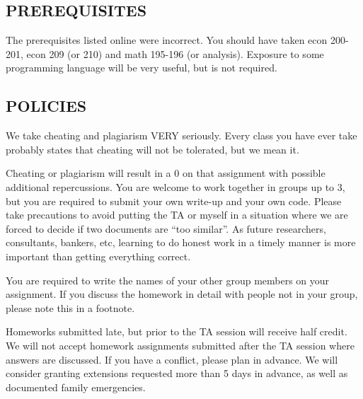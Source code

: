 \documentclass{scrartcl}
\begin{document}
\subsection*{PREREQUISITES}
The prerequisites listed online were incorrect. You should have taken econ 200-201, econ 209 (or 210) and math 195-196 (or analysis). Exposure to some programming language will be very useful, but is not required. 

\subsection*{POLICIES}

We take cheating and plagiarism VERY seriously. Every class you have ever take probably states that cheating will not be tolerated, but we mean it. %

Cheating or plagiarism will result in a 0 on that assignment with possible additional repercussions. You are welcome to work together in groups up to 3, but you are required to submit your own write-up and your own code. Please take precautions to avoid putting the TA or myself in a situation where we are forced to decide if two documents are ``too similar''. As future researchers, consultants, bankers, etc, learning to do honest work in a timely manner is more important than getting everything correct.

You are required to write the names of your other group members on your assignment. If you discuss the homework in detail with people not in your group, please note this in a footnote.


Homeworks submitted late, but prior to the TA session will receive half credit. We will not accept homework assignments submitted after the TA session where answers are discussed. If you have a conflict, please plan in advance. We will consider granting extensions requested more than 5 days in advance, as well as documented family emergencies.
\end{document}
